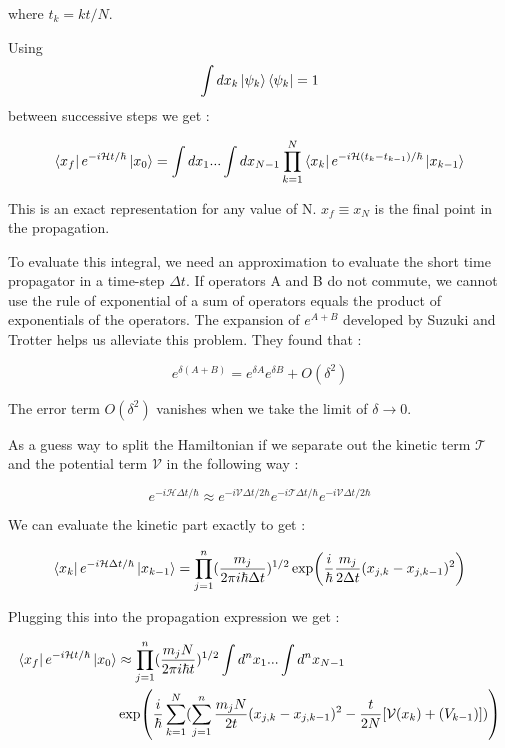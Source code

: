 where $t_k = kt/N$. 

Using $$\int dx_k \ket{\psi_k}\bra{\psi_k} = 1$$ between successive steps we get :

\begin{equation} \label{4.xx}
    \bra{x_f} e^{-i\mathcal{H}t/\hbar} \ket{x_0} = \int dx_1 ... \int dx_{N-1} \prod_{k=1}^{N} \bra{x_k} e^{-i\mathcal{H}(t_k - t_{k-1})/\hbar} \ket{x_{k-1}}
\end{equation}

This is an exact representation for any value of N. $x_f \equiv x_N$ is the final point in the  propagation.

To evaluate this integral, we need an approximation to evaluate the short time propagator in a time-step $\Delta t$. If operators A and B do not commute, we cannot use the rule of exponential of a sum of operators equals the product of exponentials of the operators. The expansion of $e^{A+B}$ developed by Suzuki and Trotter helps us alleviate this problem. They found that :

\begin{equation}\label{4.x}
e^{\delta(A + B)} = e^{\delta A}e^{\delta B} + O(\delta^2)
\end{equation}

The error term $O(\delta^2)$ vanishes when we take the limit of $\delta \to 0$.

As a guess way to split the Hamiltonian if we separate out the kinetic term $\mathcal{T}$ and the potential term $\mathcal{V}$ in the following way :

\begin{equation}\label{4.x}
e^{-i\mathcal{H}\Delta t/\hbar} \approx e^{-i\mathcal{V}\Delta t/2\hbar}e^{-i\mathcal{T}\Delta t/\hbar}e^{-i\mathcal{V}\Delta t/2\hbar} 
\end{equation}

We can evaluate the kinetic part exactly to get :

\begin{equation} \label{4.x}
\bra{x_k}e^{-i\mathcal{H} \Delta t/\hbar}\ket{x_{k-1}} = \prod_{j=1}^{n} (\frac{m_j}{2\pi i \hbar \Delta t})^{1/2} \exp(\frac{i}{\hbar} \frac{m_j}{2\Delta t} (x_{j,k} - x_{j, k-1})^2)
\end{equation}

Plugging this into the propagation expression we get :

\begin{equation} \label{4.x}
    \begin{split}
        \bra{x_f} e^{-i\mathcal{H}t/\hbar} \ket{x_0} & \approx \prod_{j=1}^{n} (\frac{m_j N}{2\pi i \hbar t})^{1/2}  \int d^n x_1 ... \int d^n x_{N-1} \\ & \exp(\frac{i}{\hbar} \sum_{k=1}^{N} (\sum_{j=1}^{n} \frac{m_j N}{2t} (x_{j,k} - x_{j, k-1})^2 - \frac{t}{2N}[\mathcal{V}(x_k) + \mathcal(V_{k-1})]))
    \end{split}
\end{equation}

